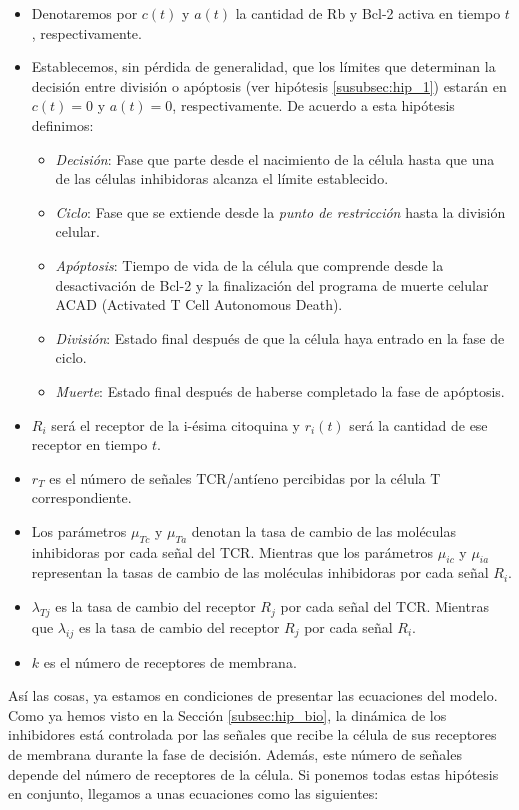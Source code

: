 \begin{itemize}
\item Denotaremos por \textit{$c(t)$} y \textit{$a(t)$} la cantidad de Rb y Bcl-2 activa en tiempo $t$, respectivamente.
\item Establecemos, sin pérdida de generalidad, que los límites que determinan la decisión entre división o apóptosis (ver hipótesis \ref{susubsec:hip_1}) estarán en $c(t)=0$ y $a(t)=0$, respectivamente. De acuerdo a esta hipótesis definimos: 
	\begin{itemize}
		\item \textit{Decisión}: Fase que parte desde el nacimiento de la célula hasta que una de las células inhibidoras alcanza el límite establecido.
		\item \textit{Ciclo}: Fase que se extiende desde la \textit{punto de restricción} hasta la división celular.
		\item \textit{Apóptosis}: Tiempo de vida de la célula que comprende desde la desactivación de Bcl-2 y la finalización del programa de muerte celular ACAD (Activated T Cell Autonomous Death).
		\item \textit{División}: Estado final después de que la célula haya entrado en la fase de ciclo.
		\item \textit{Muerte}: Estado final después de haberse completado la fase de apóptosis.
	\end{itemize}
\item \textit{$R_{i}$} será el receptor de la i-ésima citoquina y \textit{$r_{i}(t)$} será la cantidad de ese receptor en tiempo $t$. 
\item $r_{T}$ es el número de señales TCR/antíeno  percibidas por la célula T correspondiente.
\item Los parámetros $\mu_{Tc}$ y $\mu_{Ta}$ denotan la tasa de cambio de las moléculas inhibidoras por cada señal del TCR. Mientras que los parámetros $\mu_{ic}$ y $\mu_{ia}$ representan la tasas de cambio de las moléculas inhibidoras por cada señal $R_i$.
\item $\lambda_{Tj}$ es la tasa de cambio del receptor $R_{j}$ por cada señal del TCR. Mientras que $\lambda_{ij}$ es la tasa de cambio del receptor $R_j$ por cada señal $R_i$.
\item $k$ es el número de receptores de membrana.
\end{itemize} 

Así las cosas, ya estamos en condiciones de presentar las ecuaciones del modelo. Como ya hemos visto en la Sección \ref{subsec:hip_bio}, la dinámica de los inhibidores está controlada por las señales que recibe la célula de sus receptores de membrana durante la fase de decisión. Además, este número de señales depende del número de receptores de la célula. Si ponemos todas estas hipótesis en conjunto, llegamos a unas ecuaciones como las siguientes:

